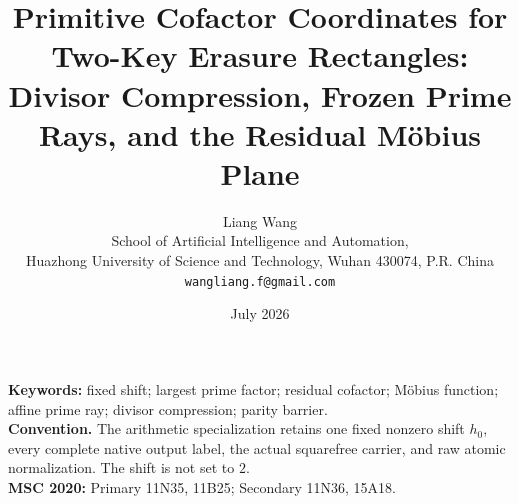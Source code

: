 \documentclass[11pt]{article}
\title{Primitive Cofactor Coordinates for Two-Key Erasure Rectangles:\\
Divisor Compression, Frozen Prime Rays, and the Residual M\"obius Plane}
\author{Liang Wang\\
School of Artificial Intelligence and Automation,\\
Huazhong University of Science and Technology, Wuhan 430074, P.R. China\\
\texttt{wangliang.f@gmail.com}}
\date{July 2026}
\theoremstyle{definition}
\theoremstyle{remark}
\begin{document}
\maketitle


\noindent\textbf{Keywords:} fixed shift; largest prime factor; residual
cofactor; M\"obius function; affine prime ray; divisor compression;
parity barrier.\\[0.45em]
\noindent\textbf{Convention.} The arithmetic specialization retains one
fixed nonzero shift \(h_0\), every complete native output label, the actual
squarefree carrier, and raw atomic normalization.  The shift is not set to
\(2\).\\[0.45em]
\noindent\textbf{MSC 2020:} Primary 11N35, 11B25; Secondary 11N36, 15A18.














\clearpage
\begingroup
\small
\raggedright


\endgroup
\end{document}
